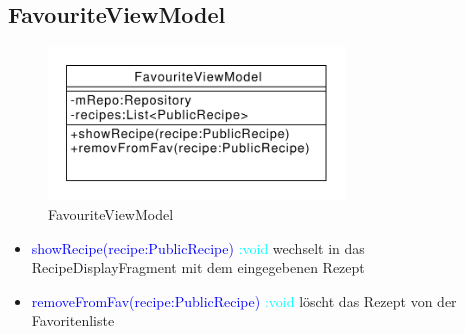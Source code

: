 \subsection{FavouriteViewModel}

\begin{figure}[H]
	\centering
	\includegraphics[width=0.7\textwidth]{pics/viewModel/Favourite_ViewModel.pdf}%
	\caption{FavouriteViewModel}%
	\label{viewModel}%
\end{figure}
\begin{itemize}
	\item \textcolor{blue}{showRecipe(recipe:PublicRecipe)} \textcolor{cyan}{:void}
	wechselt in das RecipeDisplayFragment mit dem eingegebenen Rezept
	
	\item \textcolor{blue}{removeFromFav(recipe:PublicRecipe)} \textcolor{cyan}{:void}
	löscht das Rezept von der Favoritenliste
\end{itemize}
